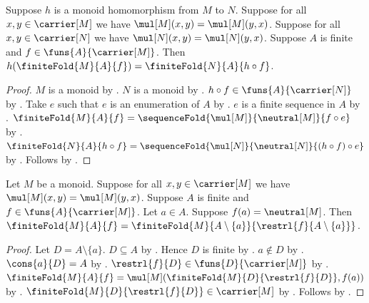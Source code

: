 \begin{theorem}\label{monoid_hom_preserves_finite_fold}
    Suppose $h$ is a monoid homomorphism from $M$ to $N$.
    Suppose for all $x,y\in\carrier[M]$ we have
        $\mul[M](x,y)=\mul[M](y,x)$.
    Suppose for all $x,y\in\carrier[N]$ we have
        $\mul[N](x,y)=\mul[N](y,x)$.
    Suppose $A$ is finite and $f\in\funs{A}{\carrier[M]}$.
    Then
        $h(\finiteFold{M}{A}{f})
        =\finiteFold{N}{A}{h\circ f}$.
\end{theorem}
\begin{proof}
    $M$ is a monoid by .
    $N$ is a monoid by .
    $h\circ f\in\funs{A}{\carrier[N]}$ by
        .
    Take $e$ such that $e$ is an enumeration of $A$ by
        .
    $e$ is a finite sequence in $A$ by
        .
    $\finiteFold{M}{A}{f}
        =\sequenceFold{\mul[M]}{\neutral[M]}{f\circ e}$ by
        .
    $\finiteFold{N}{A}{h\circ f}
        =\sequenceFold{\mul[N]}{\neutral[N]}{(h\circ f)\circ e}$ by
        .
    Follows by .
\end{proof}

\begin{theorem}\label{monoid_finite_fold_delete_neutral}
    Let $M$ be a monoid.
    Suppose for all $x,y\in\carrier[M]$ we have
        $\mul[M](x,y)=\mul[M](y,x)$.
    Suppose $A$ is finite and $f\in\funs{A}{\carrier[M]}$.
    Let $a\in A$.
    Suppose $f(a)=\neutral[M]$.
    Then
        $\finiteFold{M}{A}{f}
        =\finiteFold{M}{A\setminus\{a\}}{
            \restrl{f}{A\setminus\{a\}}}$.
\end{theorem}
\begin{proof}
    Let $D=A\setminus\{a\}$.
    $D\subseteq A$ by .
    Hence $D$ is finite by .
    $a\notin D$ by .
    $\cons{a}{D}=A$ by .
    $\restrl{f}{D}\in\funs{D}{\carrier[M]}$ by
        .
    $\finiteFold{M}{A}{f}
        =\mul[M](\finiteFold{M}{D}{\restrl{f}{D}},f(a))$ by
        .
    $\finiteFold{M}{D}{\restrl{f}{D}}\in\carrier[M]$ by
        .
    Follows by
        .
\end{proof}


